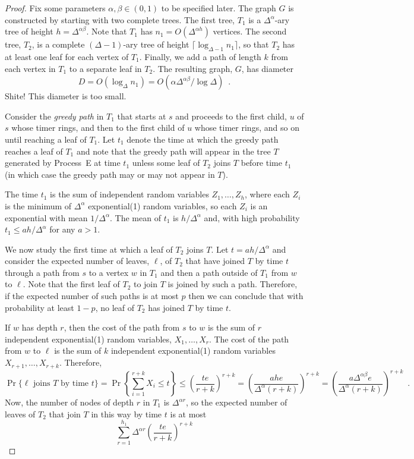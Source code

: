 \documentclass{patmorin}
\begin{document}
\begin{proof}
  Fix some parameters $\alpha,\beta\in (0,1)$ to be specified later.
  The graph $G$ is constructed by starting with two complete trees.
  The first tree, $T_1$ is a $\Delta^{\alpha}$-ary tree of height
  $h=\Delta^{\alpha\beta}$.  Note that $T_1$ has $n_1=O(\Delta^{\alpha
  h})$ vertices.  The second tree, $T_2$, is a complete $(\Delta-1)$-ary
  tree of height $\lceil\log_{\Delta-1} n_1\rceil$, so that $T_2$ has
  at least one leaf for each vertex of $T_1$.  Finally, we
  add a path of length $k$ from each vertex in $T_1$ to a separate leaf
  in $T_2$.  The resulting graph, $G$, has diameter 
  \[   D=O(\log_{\Delta} n_1) = O\left(\alpha\Delta^{\alpha\beta}/\log\Delta \right) \enspace .\]
  Shite! This diameter is too small.

  Consider the \emph{greedy path} in $T_1$ that starts at $s$ and
  proceeds to the first child, $u$ of $s$ whose timer rings, and then
  to the first child of $u$ whose timer rings, and so on until reaching
  a leaf of $T_1$. Let $t_1$ denote the time at which the greedy path
  reaches a leaf of $T_1$ and note that the greedy path will appear in
  the tree $T$ generated by Process~E at time $t_1$ unless some leaf of
  $T_2$ joins $T$ before time $t_1$ (in which case the greedy path may
  or may not appear in $T$).

  The time $t_1$ is the sum of independent random variables
  $Z_1,\ldots,Z_h$, where each $Z_i$ is the minimum of $\Delta^{\alpha}$
  exponential(1) random variables, so each $Z_i$ is an exponential with
  mean $1/\Delta^{\alpha}$.  The mean of $t_1$ is $h/\Delta^{\alpha}$
  and, with high probability $t_1\le ah/\Delta^{\alpha}$ for any $a>1$.

  We now study the first time at which a leaf of $T_2$ joins $T$.
  Let $t=ah/\Delta^{\alpha}$ and consider the expected number of leaves, $\ell$,
  of $T_2$ that have joined $T$ by time $t$ through a path from $s$
  to a vertex $w$ in $T_1$ and then a path outside of $T_1$ from $w$
  to $\ell$.  Note that the first leaf of $T_2$ to join $T$ is joined
  by such a path.  Therefore, if the expected number of such paths is
  at most $p$ then we can conclude that with probability at least $1-p$,
  no leaf of $T_2$ has joined $T$ by time $t$.

  If $w$ has depth $r$, then the cost of the path from $s$ to $w$
  is the sum of $r$ independent exponential(1) random variables,
  $X_1,\ldots,X_r$.  The cost of the path from $w$ to $\ell$
  is the sum of $k$ independent exponential(1) random variables
  $X_{r+1},\ldots,X_{r+k}$.  Therefore,
  \[
    \Pr\{\text{$\ell$ joins $T$ by time $t$}\} =
    \Pr\left\{\sum_{i=1}^{r+k}X_i \le t\right\}
      \le \left(\frac{te}{r+k}\right)^{r+k}
      = \left(\frac{ahe}{\Delta^{\alpha}(r+k)}\right)^{r+k} 
      = \left(\frac{a\Delta^{\alpha\beta}e}{\Delta^{\alpha}(r+k)}\right)^{r+k} 
 \enspace .
  \]
  Now, the number of nodes of depth $r$ in $T_1$ is $\Delta^{\alpha r}$, so
  the expected number of leaves of $T_2$ that join $T$ in this way by time $t$
  is at most
  \[
      \sum_{r=1}^{h_1} \Delta^{\alpha r}\left(\frac{te}{r+k}\right)^{r+k}
  \]

\end{proof}
\end{document}
